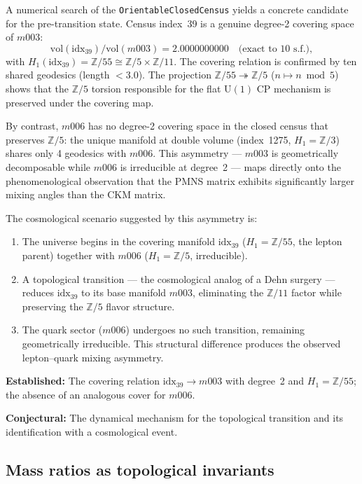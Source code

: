 ﻿\documentclass[12pt]{article}
\theoremstyle{definition}
\begin{document}
A numerical search of the \texttt{OrientableClosedCensus} yields
a concrete candidate for the pre-transition state. Census index~39
is a genuine degree-2 covering space of $m003$:
\[
  \mathrm{vol}(\text{idx}_{39}) / \mathrm{vol}(m003)
  = 2.0000000000 \quad \text{(exact to 10 s.f.)},
\]
with $H_1(\text{idx}_{39}) = \mathbb{Z}/55 \cong \mathbb{Z}/5
\times \mathbb{Z}/11$. The covering relation is confirmed by ten
shared geodesics (length $< 3.0$). The projection
$\mathbb{Z}/55 \twoheadrightarrow \mathbb{Z}/5$ ($n \mapsto n
\bmod 5$) shows that the $\mathbb{Z}/5$ torsion responsible for the
flat $\mathrm{U}(1)$ CP mechanism is preserved under the covering map.

By contrast, $m006$ has no degree-2 covering space in the closed
census that preserves $\mathbb{Z}/5$: the unique manifold at double
volume (index~1275, $H_1 = \mathbb{Z}/3$) shares only 4 geodesics with $m006$. This asymmetry --- $m003$ is geometrically
decomposable while $m006$ is irreducible at degree~2 --- maps
directly onto the phenomenological observation that the PMNS matrix
exhibits significantly larger mixing angles than the CKM matrix.

The cosmological scenario suggested by this asymmetry is:
\begin{enumerate}
\item The universe begins in the covering manifold
  $\text{idx}_{39}$ ($H_1 = \mathbb{Z}/55$, the lepton parent)
  together with $m006$ ($H_1 = \mathbb{Z}/5$, irreducible).
\item A topological transition --- the cosmological analog of a
  Dehn surgery --- reduces $\text{idx}_{39}$ to its base manifold
  $m003$, eliminating the $\mathbb{Z}/11$ factor while preserving
  the $\mathbb{Z}/5$ flavor structure.
\item The quark sector ($m006$) undergoes no such transition,
  remaining geometrically irreducible. This structural difference
  produces the observed lepton--quark mixing asymmetry.
\end{enumerate}

\textbf{Established:} The covering relation $\text{idx}_{39}
\to m003$ with degree~2 and $H_1 = \mathbb{Z}/55$; the absence of
an analogous cover for $m006$.

\textbf{Conjectural:} The dynamical mechanism for the topological
transition and its identification with a cosmological event.

\subsection{Mass ratios as topological invariants}
\end{document}
